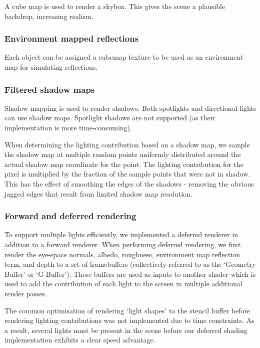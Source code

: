 \documentclass[11pt]{scrartcl} %
\begin{document}
            A cube map is used to render a skybox. This gives the scene a
            plausible backdrop, increasing realism.

        \subsubsection{Environment mapped reflections}

            Each object can be assigned a cubemap texture to be used as an
            environment map for simulating reflections.

        \subsubsection{Filtered shadow maps}

            Shadow mapping is used to render shadows. Both spotlights and
            directional lights can use shadow maps. Spotlight shadows are not
            supported (as their implementation is more time-consuming).

            When determining the lighting contribution based on a shadow map,
            we sample the shadow map at multiple random points uniformly
            distributed around the actual shadow map coordinate for the point.
            The lighting contribution for the pixel is multiplied by the
            fraction of the sample points that were not in shadow. This has the
            effect of smoothing the edges of the shadows - removing the obvious
            jagged edges that result from limited shadow map resolution.

        \subsubsection{Forward and deferred rendering}

            To support multiple lights efficiently, we implemented a deferred
            renderer in addition to a forward renderer. When performing
            deferred rendering, we first render the eye-space normals, albedo,
            roughness, environment map reflection term, and depth to a set of
            framebuffers (collectively referred to as the `Geometry Buffer' or
            `G-Buffer'). These buffers are used as inputs to another shader
            which is used to add the contribution of each light to the screen
            in multiple additional render passes.

            The common optimisation of rendering `light shapes' to the stencil
            buffer before rendering lighting contributions was not implemented
            due to time constraints. As a result, several lights must be
            present in the scene before our deferred shading implementation
            exhibits a clear speed advantage.
\end{document}
